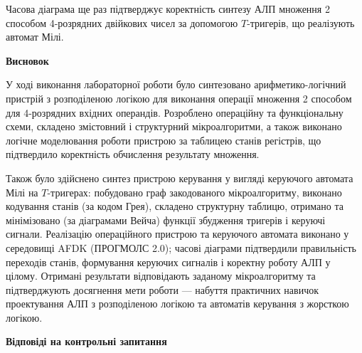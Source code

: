 \documentclass[12pt,a4paper]{article}
\begin{document}
    Часова діаграма ще раз підтверджує коректність синтезу АЛП множення 2 способом 4-розрядних двійкових чисел
    за допомогою $T$-тригерів, що реалізують автомат Мілі.

    \begin{center} \textbf{\large Висновок} \end{center}

    У ході виконання лабораторної роботи було синтезовано арифметико-логічний пристрій з розподіленою логікою для виконання операції множення 2 способом для 4-розрядних вхідних операндів. Розроблено операційну та функціональну схеми, складено змістовний і структурний мікроалгоритми, а також виконано логічне моделювання роботи пристрою за таблицею станів регістрів, що підтвердило коректність обчислення результату множення.

    Також було здійснено синтез пристрою керування у вигляді керуючого автомата Мілі на $T$-тригерах: побудовано граф закодованого мікроалгоритму, виконано кодування станів (за кодом Грея), складено структурну таблицю, отримано та мінімізовано (за діаграмами Вейча) функції збудження тригерів і керуючі сигнали. Реалізацію операційного пристрою та керуючого автомата виконано у середовищі AFDK (ПРОГМОЛС 2.0); часові діаграми підтвердили правильність переходів станів, формування керуючих сигналів і коректну роботу АЛП у цілому. Отримані результати відповідають заданому мікроалгоритму та підтверджують досягнення мети роботи — набуття практичних навичок проектування АЛП з розподіленою логікою та автоматів керування з жорсткою логікою.

    \begin{center} \textbf{\large Відповіді на контрольні запитання} \end{center}
\end{document}

